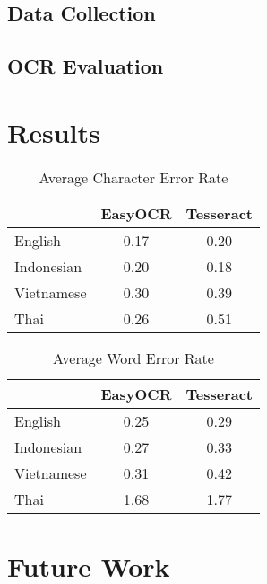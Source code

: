 \documentclass[12pt,oneside]{memoir}
\begin{document}
\section{Data Collection}

\section{OCR Evaluation}

\parencite{smith-2013}

\chapter{Results}

\begin{table}[h]
    \centering
    \begin{tabular}{lcc}
        \toprule
        & EasyOCR & Tesseract \\
        \midrule
        English & 0.17 & 0.20\\
        Indonesian & 0.20& 0.18\\
        Vietnamese & 0.30& 0.39\\
        Thai & 0.26 & 0.51\\
        \bottomrule
    \end{tabular}
    \caption{Average Character Error Rate}
\end{table}

\begin{table}[h]
    \centering
    \begin{tabular}{lcc}
        \toprule
        
        & EasyOCR & Tesseract \\
        \midrule
        English & 0.25 & 0.29\\
        Indonesian & 0.27& 0.33\\
        Vietnamese & 0.31& 0.42\\
        Thai & 1.68 & 1.77\\
        \bottomrule
    \end{tabular}
    \caption{Average Word Error Rate}
\end{table}

\chapter{Future Work}

\printbibliography[title={References}]
\end{document}
